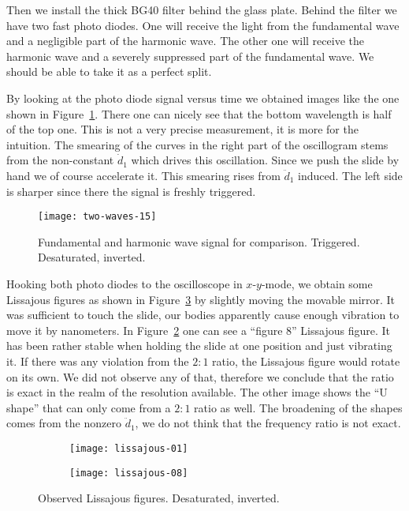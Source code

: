 \documentclass[11pt, english, fleqn, DIV=15, headinclude, BCOR=2cm]{scrreprt}
\begin{document}
Then we install the thick BG40 filter behind the glass plate. Behind the filter
we have two fast photo diodes. One will receive the light from the fundamental
wave and a negligible part of the harmonic wave. The other one will receive the
harmonic wave and a severely suppressed part of the fundamental wave. We should
be able to take it as a perfect split.

By looking at the photo diode signal versus time we obtained images like the
one shown in Figure~\ref{fig:two-waves-15}. There one can nicely see that the
bottom wavelength is half of the top one. This is not a very precise
measurement, it is more for the intuition. The smearing of the curves in the
right part of the oscillogram stems from the non-constant $\dot d_1$ which
drives this oscillation. Since we push the slide by hand we of course
accelerate it. This smearing rises from $\ddot d_1$ induced. The left side is
sharper since there the signal is freshly triggered.

\begin{figure}
    \centering
    \texttt{[image: two-waves-15]}
    \caption{%
        Fundamental and harmonic wave signal for comparison. Triggered.
        Desaturated, inverted.
    }
    \label{fig:two-waves-15}
\end{figure}

Hooking both photo diodes to the oscilloscope in $x$-$y$-mode, we obtain some
Lissajous figures as shown in Figure~\ref{fig:lissajous-measured} by slightly
moving the movable mirror. It was sufficient to touch the slide, our bodies
apparently cause enough vibration to move it by nanometers. In
Figure~\ref{fig:lissajous-01} one can see a \enquote{figure 8} Lissajous
figure. It has been rather stable when holding the slide at one position and
just vibrating it. If there was any violation from the $2:1$ ratio, the
Lissajous figure would rotate on its own. We did not observe any of that,
therefore we conclude that the ratio is exact in the realm of the resolution
available. The other image shows the \enquote{U shape} that can only come from
a $2:1$ ratio as well. The broadening of the shapes comes from the nonzero
$\ddot d_1$, we do not think that the frequency ratio is not exact.

\begin{figure}
    \centering
    \begin{subfigure}[c]{0.48\linewidth}
        \centering
        \texttt{[image: lissajous-01]}
        \caption{%
            }
        \label{fig:lissajous-01}
    \end{subfigure}
    \hfill
    \begin{subfigure}[c]{0.48\linewidth}
        \centering
        \texttt{[image: lissajous-08]}
        \caption{%
            }
    \end{subfigure}
    \caption{%
        Observed Lissajous figures. Desaturated, inverted.
        }
    \label{fig:lissajous-measured}
\end{figure}

\end{document}
